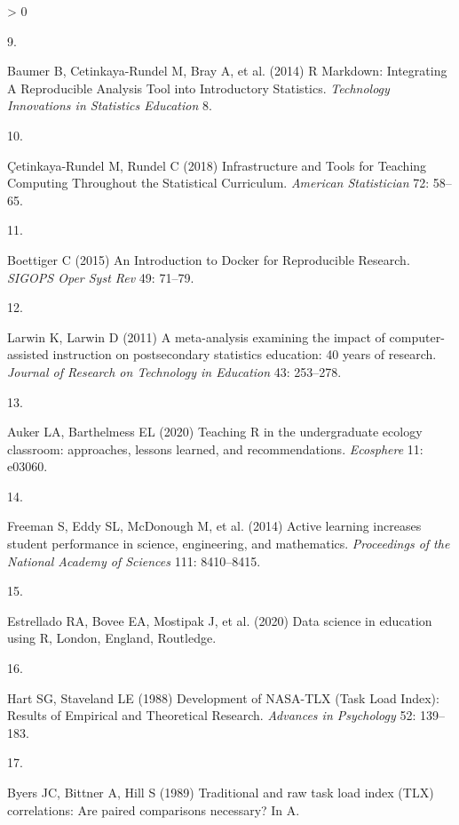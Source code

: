 \documentclass[
]{article}
\newlength{\cslhangindent}
\newlength{\csllabelwidth}
\newenvironment{CSLReferences}[2] %
 {%
  \setlength{\parindent}{0pt}
  \ifodd #1 \everypar{\setlength{\hangindent}{\cslhangindent}}\ignorespaces\fi
  \ifnum #2 > 0
  \setlength{\parskip}{#2\baselineskip}
  \fi
 }%
 {}
\newcommand{\CSLLeftMargin}[1]{\parbox[t]{\csllabelwidth}{#1}}
\newcommand{\CSLRightInline}[1]{\parbox[t]{\linewidth - \csllabelwidth}{#1}\break}
\begin{document}
\begin{CSLReferences}{0}{0}
\leavevmode\hypertarget{ref-Baumer2014}{}%
\CSLLeftMargin{9. }
\CSLRightInline{Baumer B, Cetinkaya-Rundel M, Bray A, et al. (2014) {R
Markdown: Integrating A Reproducible Analysis Tool into Introductory
Statistics}. \emph{Technology Innovations in Statistics Education} 8.}

\leavevmode\hypertarget{ref-Cetinkaya-Rundel2018}{}%
\CSLLeftMargin{10. }
\CSLRightInline{Çetinkaya-Rundel M, Rundel C (2018) {Infrastructure and
Tools for Teaching Computing Throughout the Statistical Curriculum}.
\emph{American Statistician} 72: 58--65.}

\leavevmode\hypertarget{ref-Boettiger2015}{}%
\CSLLeftMargin{11. }
\CSLRightInline{Boettiger C (2015) {An Introduction to Docker for
Reproducible Research}. \emph{SIGOPS Oper Syst Rev} 49: 71--79.}

\leavevmode\hypertarget{ref-Larwin2011}{}%
\CSLLeftMargin{12. }
\CSLRightInline{Larwin K, Larwin D (2011) {A meta-analysis examining the
impact of computer-assisted instruction on postsecondary statistics
education: 40 years of research}. \emph{Journal of Research on
Technology in Education} 43: 253--278.}

\leavevmode\hypertarget{ref-Auker2020}{}%
\CSLLeftMargin{13. }
\CSLRightInline{Auker LA, Barthelmess EL (2020) {Teaching R in the
undergraduate ecology classroom: approaches, lessons learned, and
recommendations}. \emph{Ecosphere} 11: e03060.}

\leavevmode\hypertarget{ref-Freeman2014}{}%
\CSLLeftMargin{14. }
\CSLRightInline{Freeman S, Eddy SL, McDonough M, et al. (2014) {Active
learning increases student performance in science, engineering, and
mathematics}. \emph{Proceedings of the National Academy of Sciences}
111: 8410--8415.}

\leavevmode\hypertarget{ref-Estrellado2020}{}%
\CSLLeftMargin{15. }
\CSLRightInline{Estrellado RA, Bovee EA, Mostipak J, et al. (2020) {Data
science in education using R}, London, England, Routledge.}

\leavevmode\hypertarget{ref-Hart1988}{}%
\CSLLeftMargin{16. }
\CSLRightInline{Hart SG, Staveland LE (1988) {Development of NASA-TLX
(Task Load Index): Results of Empirical and Theoretical Research}.
\emph{Advances in Psychology} 52: 139--183.}

\leavevmode\hypertarget{ref-Byers1989}{}%
\CSLLeftMargin{17. }
\CSLRightInline{Byers JC, Bittner A, Hill S (1989) {Traditional and raw
task load index (TLX) correlations: Are paired comparisons necessary? In
A}.}

\end{CSLReferences}
\end{document}
